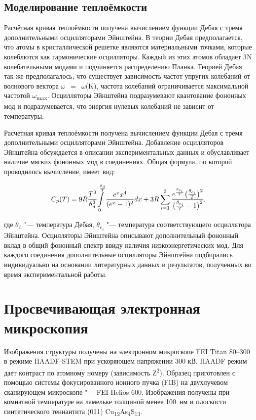 \subsection{Моделирование теплоёмкости}\label{sect2_4_2}
Расчётная кривая теплоёмкости получена вычислением функции Дебая с тремя дополнительными осцилляторами Эйнштейна. В теории Дебая предполагается, что атомы в кристаллической решетке являются материальными точками, которые колеблются как гармонические осцилляторы. 
Каждый из этих атомов обладает 3N колебательными модами и подчиняется распределению Планка. 
Теорией Дебая так же предполагалось, что существует зависимость частот упругих колебаний от волнового вектора $\omega$~$=$~$\omega$(K), частота колебаний ограничивается максимальной частотой $\omega$\textsubscript{max}. Осцилляторы Эйнштейна подразумевают квантование фононных мод и подразумевается, что энергия нулевых колебаний не зависит от температуры.
 
Расчетная кривая теплоёмкости получена вычислением функции Дебая с тремя дополнительными осцилляторами Эйнштейна. Добавление осцилляторов Эйнштейна обсуждается в описании экспериментальных данных и обуславливает наличие мягких фононных мод в соединениях. Общая формула, по которой проводилось вычисление, имеет вид:

\begin{equation}
  \label{eq:equation2_4}
C_p(T)=9R\cfrac{T^3}{\theta_d^3}\int\limits_0^{\frac{\theta_d}{T}}\frac{e^xx^4}{(e^x-1)^2}dx+3R\sum_{i=1}^3\cfrac{e^{\frac{\theta_{e_i}}{T}}\big(\frac{\theta_{e_i}}{T}\big)^2}{\big(\frac{\theta_{e_i}}{T}-1\big)^2},
\end{equation}

где $\theta$\textsubscript{d} "--- температура Дебая, $\theta$\textsubscript{$e_i$} "--- температура соответствующего осциллятора Эйнштейна. 
Осцилляторы Эйнштейна описывают дополнительный фононный вклад в общий фононный спектр ввиду наличия низкоэнергетических мод. 
Для каждого соединения дополнительные осцилляторы Эйнштейна подбирались индивидуально на основании  литературных данных и результатов, полученных во время экспериментальной работы.
\newpage
\section{Просвечивающая электронная микроскопия} \label{sect2_4}

Изображения структуры получены на электронном микроскопе FEI Titan 80--300 в режиме HAADF-STEM  при ускоряющем напряжении 300 кВ.
HAADF режим дает контраст по атомному номеру (зависимость Z\textsuperscript{2}).  
Образец приготовлен с помощью системы фокусированного ионного пучка (FIB) на двухлучевом сканирующем микроскопе "--- FEI Helios 600.
Изображения получены при комнатной температуре на ламельке толщиной менее 100~нм и плоскости синтетического теннантита (011) Cu\textsubscript{12}As\textsubscript{4}S\textsubscript{13}. 



